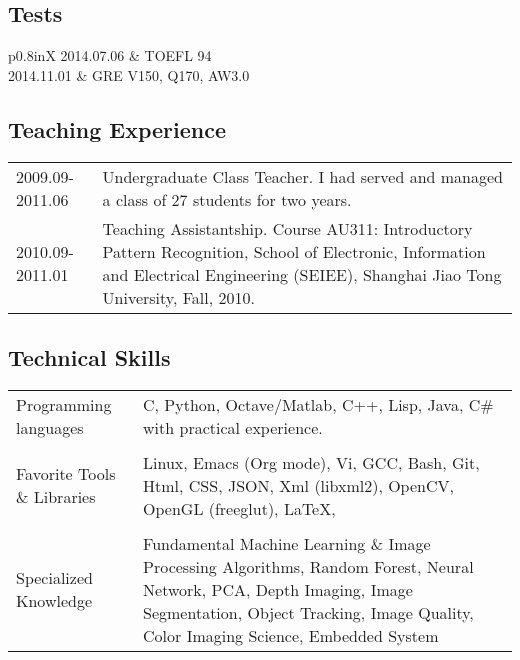 \documentclass[10pt, a4paper]{article}
\begin{document}
\subsection*{Tests}
\label{sec-1-7}
\begin{center}
\begin{tabularx}{\linewidth}{p{0.8in}X}
2014.07.06 & TOEFL 94\\
2014.11.01 & GRE   V150, Q170, AW3.0\\
\end{tabularx}
\end{center}

\subsection*{Teaching Experience}
\label{sec-1-8}
\begin{center}
\begin{tabularx}{\linewidth}{lX}
2009.09-2011.06 & Undergraduate Class Teacher. I had served and managed a class of 27 students for two years.\\
2010.09-2011.01 & Teaching Assistantship. Course AU311: Introductory Pattern Recognition, School of Electronic, Information and Electrical Engineering (SEIEE), Shanghai Jiao Tong University, Fall, 2010.\\
\end{tabularx}
\end{center}

\subsection*{Technical Skills}
\label{sec-1-9}
\begin{center}
\begin{tabularx}{\linewidth}{p{1in}X}
Programming languages & C, Python, Octave/Matlab, C++, Lisp, Java, C\# with practical experience.\\
 & \\
Favorite Tools \& Libraries & Linux, Emacs (Org mode), Vi, GCC, Bash, Git, Html, CSS, JSON, Xml (libxml2), OpenCV, OpenGL (freeglut), \LaTeX{},\\
 & \\
Specialized Knowledge & Fundamental Machine Learning \& Image Processing Algorithms, Random Forest, Neural Network, PCA, Depth Imaging, Image Segmentation, Object Tracking, Image Quality, Color Imaging Science, Embedded System\\
\end{tabularx}
\end{center}
\end{document}
